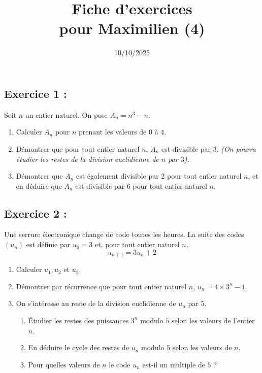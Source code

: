 \documentclass[12pt,a4paper]{article}
\title{Fiche d'exercices \\ pour Maximilien (4)}
\date{10/10/2025}
\author{}
\begin{document}
\maketitle


\subsection*{Exercice 1 :}

Soit $n$ un entier naturel. On pose $A_n = n^3 - n$.

\begin{enumerate}
    \item Calculer $A_n$ pour $n$ prenant les valeurs de $0$ à $4$.
    \item Démontrer que pour tout entier naturel $n$, $A_n$ est divisible par $3$. \textit{(On pourra étudier les restes de la division euclidienne de $n$ par $3$).}
    \item Démontrer que $A_n$ est également divisible par $2$ pour tout entier naturel $n$, et en déduire que $A_n$ est divisible par $6$ pour tout entier naturel $n$.
\end{enumerate}

\subsection*{Exercice 2 :}

Une serrure électronique change de code toutes les heures. La suite des codes $(u_n)$ est définie par $u_0 = 3$ et, pour tout entier naturel $n$, 
\[ u_{n+1} = 3u_n + 2 \]

\begin{enumerate}
    \item Calculer $u_1, u_2$ et $u_3$.
    \item Démontrer par récurrence que pour tout entier naturel $n$, $u_n = 4 \times 3^n - 1$.
    \item On s'intéresse au reste de la division euclidienne de $u_n$ par $5$.
    \begin{enumerate}
        \item Étudier les restes des puissances $3^n$ modulo $5$ selon les valeurs de l'entier $n$.
        \item En déduire le cycle des restes de $u_n$ modulo $5$ selon les valeurs de $n$.
        \item Pour quelles valeurs de $n$ le code $u_n$ est-il un multiple de $5$ ?
    \end{enumerate}
\end{enumerate}
\end{document}
